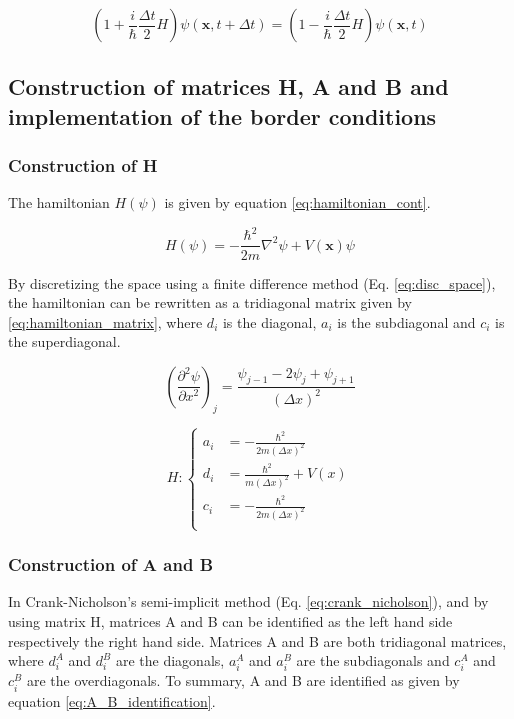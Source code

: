 \documentclass[a4paper,12pt,twoside]{article}
\newcommand{\mbf}[1]{\mathbf{#1}} %
\newcommand{\bracket}[1]{\left(#1\right)}
\begin{document}
    \begin{equation}
      \bracket{1 + \frac{i}{\hbar}\frac{\Delta t}{2}H}\psi(\mbf{x}, t + \Delta t) = \bracket{1 - \frac{i}{\hbar}\frac{\Delta t}{2}H}\psi(\mbf{x}, t)
      \label{eq:crank_nicholson}
    \end{equation}



  \subsection{Construction of matrices H, A and B and implementation of the border conditions}
    \subsubsection{Construction of H}\label{sec:constr_H}
      The hamiltonian $H(\psi)$ is given by equation \eqref{eq:hamiltonian_cont}.

      \begin{equation}
        H(\psi) = -\frac{\hbar^2}{2m}\nabla^2\psi + V(\mbf{x})\psi
        \label{eq:hamiltonian_cont}
      \end{equation}

      By discretizing the space using a finite difference method (Eq. \eqref{eq:disc_space}), the hamiltonian can be rewritten as a tridiagonal matrix given by \eqref{eq:hamiltonian_matrix}, where $d_i$ is the diagonal, $a_i$ is the subdiagonal and $c_i$ is the superdiagonal.

      \begin{equation}
        \bracket{\frac{\partial^2\psi}{\partial x^2}}_j = \frac{\psi_{j-1} - 2\psi_j + \psi_{j+1}}{\bracket{\Delta x}^2}
        \label{eq:disc_space}
      \end{equation}

      \begin{equation}
        H: \begin{cases}
          a_i &= -\frac{\hbar^2}{2m(\Delta x)^2}\\
          d_i &= \frac{\hbar^2}{m(\Delta x)^2} + V(x)\\
          c_i &= -\frac{\hbar^2}{2m(\Delta x)^2}\\
        \end{cases}
        \label{eq:hamiltonian_matrix}
      \end{equation}

    \subsubsection{Construction of A and B}
      In Crank-Nicholson's semi-implicit method (Eq. \eqref{eq:crank_nicholson}), and by using matrix H, matrices A and B can be identified as the left hand side respectively the right hand side.
      Matrices A and B are both tridiagonal matrices, where $d_i^A$ and $d_i^B$ are the diagonals, $a_i^A$ and $a_i^B$ are the subdiagonals and $c_i^A$ and $c_i^B$ are the overdiagonals.
      To summary, A and B are identified as given by equation \eqref{eq:A_B_identification}.
\end{document}

